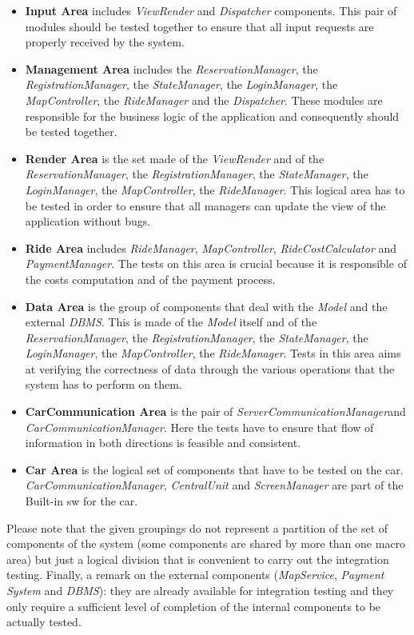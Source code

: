 \documentclass[11pt,a4paper]{report}
\begin{document}
\begin{itemize}
\item \textbf{Input Area} includes \textit{ViewRender} and \textit{Dispatcher} components. This pair of modules should be tested together to ensure that all input requests are properly received by the system.
\item \textbf{Management Area} includes the \textit{ReservationManager}, the \textit{RegistrationManager}, the \textit{StateManager}, the \textit{LoginManager}, the \textit{MapController}, the \textit{RideManager} and the \textit{Dispatcher}. These modules are responsible for the business logic of the application and consequently should be tested together.
\item \textbf{Render Area} is the set made of the \textit{ViewRender} and of the \textit{ReservationManager}, the \textit{RegistrationManager}, the \textit{StateManager}, the \textit{LoginManager}, the \textit{MapController}, the \textit{RideManager}. This logical area has to be tested in order to ensure that all managers can update the view of the application without bugs.
\item \textbf{Ride Area} includes \textit{RideManager},  \textit{MapController}, \textit{RideCostCalculator} and \textit{PaymentManager}. The tests on this area is crucial because it is responsible of the costs computation and of the payment process.
\item \textbf{Data Area} is the group of components that deal with the \textit{Model} and the external \textit{DBMS}. This is made of the \textit{Model} itself and of the \textit{ReservationManager}, the \textit{RegistrationManager}, the \textit{StateManager}, the \textit{LoginManager}, the \textit{MapController}, the \textit{RideManager}. Tests in this area aims at verifying the correctness of data through the various operations that the system has to perform on them.
\item \textbf{CarCommunication Area} is the pair of \textit{ServerCommunicationManager}and \textit{CarCommunicationManager}. Here the tests have to ensure that flow of information in both directions is feasible and consistent.
\item \textbf{Car Area} is the logical set of components that have to be tested on the car. \textit{CarCommunicationManager}, \textit{CentralUnit} and \textit{ScreenManager} are part of the Built-in sw for the car. 
\end{itemize}
Please note that the given groupings do not represent a partition of the set of components of the system (some components are shared by more than one macro area) but just a logical division that is convenient to carry out the integration testing. 
Finally, a remark on the external components (\textit{MapService}, \textit{Payment System} and \textit{DBMS}): they are already available for integration testing and they only require a sufficient level of completion of the internal components to be actually tested.
\end{document}
